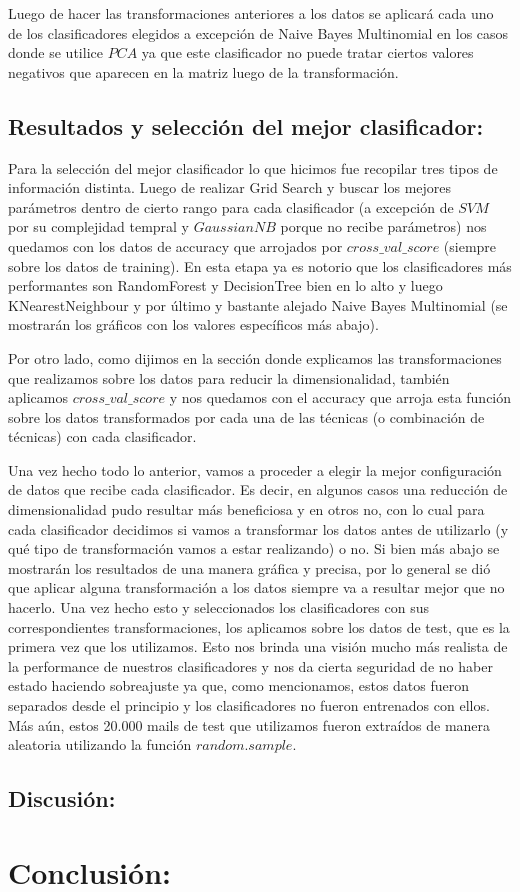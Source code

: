 \documentclass[a4paper]{article}
\begin{document}
Luego de hacer las transformaciones anteriores a los datos se aplicará cada uno de los clasificadores elegidos a excepción de Naive Bayes Multinomial en los casos donde se utilice $PCA$ ya que este clasificador no puede tratar ciertos valores negativos que aparecen en la matriz luego de la transformación.

\newpage

\subsection{Resultados y selección del mejor clasificador:}
Para la selección del mejor clasificador lo que hicimos fue recopilar tres tipos de información distinta. Luego de realizar Grid Search y buscar los mejores parámetros dentro de cierto rango para cada clasificador (a excepción de $SVM$ por su complejidad tempral y $GaussianNB$ porque no recibe parámetros) nos quedamos con los datos de accuracy que arrojados por $cross\_val\_score$ (siempre sobre los datos de training). En esta etapa ya es notorio que los clasificadores más performantes son RandomForest y DecisionTree bien en lo alto y luego KNearestNeighbour y por último y bastante alejado Naive Bayes Multinomial (se mostrarán los gráficos con los valores específicos más abajo).

Por otro lado, como dijimos en la sección donde explicamos las transformaciones que realizamos sobre los datos para reducir la dimensionalidad, también aplicamos $cross\_val\_score$ y nos quedamos con el accuracy que arroja esta función sobre los datos transformados por cada una de las técnicas (o combinación de técnicas) con cada clasificador.

Una vez hecho todo lo anterior, vamos a proceder a elegir la mejor configuración de datos que recibe cada clasificador. Es decir, en algunos casos una reducción de dimensionalidad pudo resultar más beneficiosa y en otros no, con lo cual para cada clasificador decidimos si vamos a transformar los datos antes de utilizarlo (y qué tipo de transformación vamos a estar realizando) o no. Si bien más abajo se mostrarán los resultados de una manera gráfica y precisa, por lo general se dió que aplicar alguna transformación a los datos siempre va a resultar mejor que no hacerlo. Una vez hecho esto y seleccionados los clasificadores con sus correspondientes transformaciones, los aplicamos sobre los datos de test, que es la primera vez que los utilizamos. Esto nos brinda una visión mucho más realista de la performance de nuestros clasificadores y nos da cierta seguridad de no haber estado haciendo sobreajuste ya que, como mencionamos, estos datos fueron separados desde el principio y los clasificadores no fueron entrenados con ellos. Más aún, estos 20.000 mails de test que utilizamos fueron extraídos de manera aleatoria utilizando la función $random.sample$.


\newpage

\subsection{Discusión:}



\newpage

\section{Conclusión:}
\end{document}
